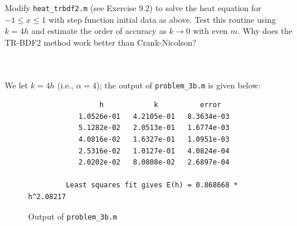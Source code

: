 Modify \texttt{heat\_trbdf2.m} (see Exercise 9.2) to solve the heat equation for $-1 \le x \le 1$ with step function
initial data as above. Test this routine using $k = 4h$ and estimate the order of accuracy as $k \to 0$ with even $m$.
Why does the TR-BDF2 method work better than Crank-Nicolson?

\begin{solution}\ \\\\
    We let $k = 4h$ (i.e., $\alpha = 4$); the output of \texttt{problem\_3b.m} is given below:
    
    \begin{figure}[h]
        \centering
        \begin{verbatim}
                 h            k          error
            1.0526e-01   4.2105e-01   8.3634e-03
            5.1282e-02   2.0513e-01   1.6774e-03
            4.0816e-02   1.6327e-01   1.0951e-03
            2.5316e-02   1.0127e-01   4.0824e-04
            2.0202e-02   8.0808e-02   2.6897e-04
          
         Least squares fit gives E(h) = 0.868668 * h^2.08217
        \end{verbatim}
        \caption{Output of \texttt{problem\_3b.m}}
    \end{figure}
    

\end{solution}
